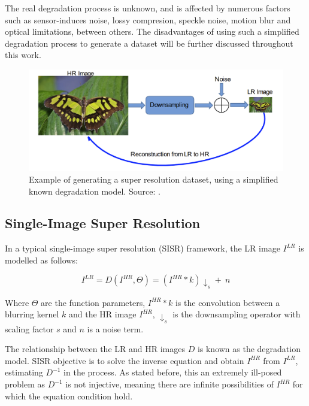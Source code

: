     The real degradation process is unknown, and is affected by numerous factors such as sensor-induces noise, lossy compresion, speckle noise, motion blur and optical limitations, between others.
    The disadvantages of using such a simplified degradation process to generate a dataset will be further discussed throughout this work.

    \begin{figure}[H]
        \centering
        \includegraphics[width=\textwidth]{Includes/3-super-resolution-data.png}
        \caption{Example of generating a super resolution dataset, using a simplified known degradation model. Source: \cite{bashir2021comprehensive}.}
        \label{fig:3-super-resolution-data}
    \end{figure}

    

    \subsection{Single-Image Super Resolution}

        In a typical single-image super resolution (SISR) framework, the LR image $I^{LR}$ is modelled as follows:
    
        \begin{equation}
            I^{LR} = D(I^{HR},\Theta) = ( I^{HR} \ast k) \downarrow_s + \ n
            \label{eq:2-degradation-equation}
        \end{equation}
    
        Where $\Theta$ are the function parameters, $I^{HR} \ast k$ is the convolution between a blurring kernel $k$ and the  HR image  $I^{HR}$, $\downarrow_s$ is the downsampling operator with scaling factor $s$ and $n$ is a noise term.
        
        The relationship between the LR and HR images $D$ is known as the degradation model.
        SISR objective is to solve the inverse equation and obtain $I^{HR}$ from $I^{LR}$, estimating $D^{-1}$ in the process. As stated before, this an extremely ill-posed problem as $D^{-1}$ is not injective, meaning there are infinite possibilities of $I^{HR}$ for which the equation condition hold. 

